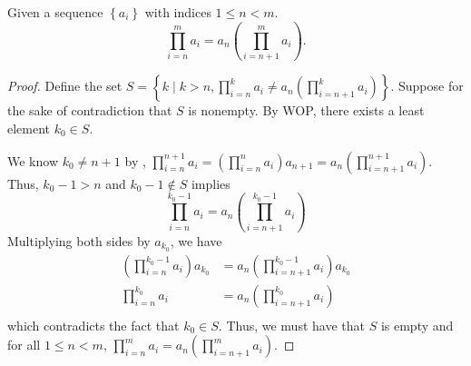 \begin{lemma}\label{prod_split_from_start}
    Given a sequence $\left\{ a_i \right\}$ with indices $1\leq n<m$.
    \begin{equation*}
        \prod_{i=n}^m a_i = a_{n} (\prod_{i=n+1}^m a_i).
    \end{equation*}
\end{lemma}
\begin{proof}
    Define the set $S=\left\{ k\mid k>n, \prod_{i=n}^k a_i \neq a_n \left( \prod_{i=n+1}^k a_i \right) \right\}$. Suppose for the sake of contradiction that $S$ is nonempty. By WOP, there exists a least element $k_0\in S$. 

    We know $k_0\neq n+1$ by , $\prod_{i=n}^{n+1} a_i=\left(\prod_{i=n}^n a_i\right) a_{n+1}=a_n \left(\prod_{i=n+1}^{n+1} a_i\right) $. Thus, $k_0-1>n$ and $k_0-1 \not\in S$ implies
    \begin{equation*}
        \prod_{i=n}^{k_0-1} a_i = a_n \left(\prod_{i=n+1}^{k_0-1} a_i\right)
    \end{equation*}
    Multiplying both sides by $a_{k_0}$, we have
    \begin{equation*}
        \begin{aligned}
            \left( \prod_{i=n}^{k_0-1} a_i \right) a_{k_0}&= a_n \left( \prod_{i=n+1}^{k_0-1} a_i \right) a_{k_0}\\
            \prod_{i=n}^{k_0} a_i &= a_n \left( \prod_{i=n+1}^{k_0} a_i \right)\\
        \end{aligned}
    \end{equation*}
    which contradicts the fact that $k_0 \in S$. Thus, we must have that $S$ is empty and for all $1\leq n<m$, $\prod_{i=n}^m a_i = a_{n} \left(\prod_{i=n+1}^m a_i \right)$.
\end{proof}

